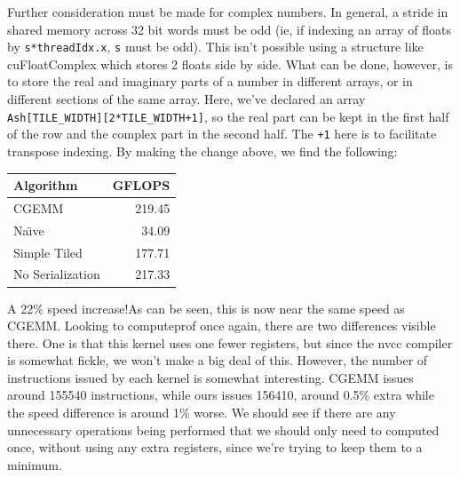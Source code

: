 \documentclass[a4paper,12pt]{report}
\newenvironment{CUDAtiming}%
{\setlength{\extrarowheight}{1.5pt} \begin{center}\begin{tabular}{l|r} Algorithm & GFLOPS\\\hline}%
{\end{tabular}\end{center}}
\begin{document}
Further consideration must be made for complex numbers.
In general, a stride in shared memory across 32 bit words must be odd (ie, if indexing an array of floats by \verb!s*threadIdx.x!, \verb!s! must be odd).
This isn't possible using a structure like cuFloatComplex which stores 2 floats side by side.
What can be done, however, is to store the real and imaginary parts of a number in different arrays, or in different sections of the same array.
Here, we've declared an array \verb!Ash[TILE_WIDTH][2*TILE_WIDTH+1]!, so the real part can be kept in the first half of the row and the complex part in the second half.
The \verb!+1! here is to facilitate transpose indexing.
By making the change above, we find the following:

\begin{CUDAtiming}
CGEMM & 219.45\\
Na{\"\i}ve & 34.09\\
Simple Tiled & 177.71\\
No Serialization & 217.33
\end{CUDAtiming}

A 22\%
speed increase!As can be seen, this is now near the same speed as CGEMM.
Looking to computeprof once again, there are two differences visible there.
One is that this kernel uses one fewer registers, but since the nvcc compiler is somewhat fickle, we won't make a big deal of this.
However, the number of instructions issued by each kernel is somewhat interesting.
CGEMM issues around 155540 instructions, while ours issues 156410, around 0.5\%
extra while the speed difference is around 1\%
worse.
We should see if there are any unnecessary operations being performed that we should only need to computed once, without using any extra registers, since we're trying to keep them to a minimum.
\end{document}
